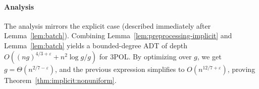 \paragraph{Analysis}
The analysis mirrors the explicit case (described immediately after
Lemma~\ref{lem:batch}). Combining Lemma~\ref{lem:preprocessing-implicit} and
Lemma~\ref{lem:batch} yields a
bounded-degree ADT of depth $O({(ng)}^{4/3+\varepsilon} + n^2 \log g / g)$
for 3POL\@.
%
By optimizing over $g$, we get $g =
\Theta(n^{2/7-\varepsilon})$, and the previous expression simplifies to
$O(n^{12/7+\varepsilon})$, proving Theorem~\ref{thm:implicit:nonuniform}.
